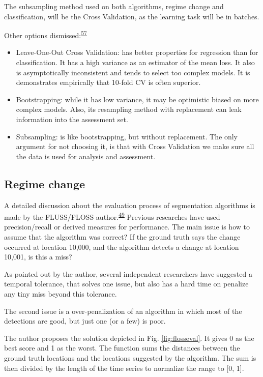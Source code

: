 \documentclass[12pt,twoside]{fmupthesis}
\begin{document}
The subsampling method used on both algorithms, regime change and classification, will be
the Cross Validation, as the learning task will be in batches.

Other options dismissed:\textsuperscript{\protect\hyperlink{ref-Bischl2012}{57}}
\begin{itemize}
\item
  Leave-One-Out Cross Validation: has better properties for regression than for classification. It
  has a high variance as an estimator of the mean loss. It also is asymptotically inconsistent and
  tends to select too complex models. It is demonstrates empirically that 10-fold CV is often
  superior.
\item
  Bootstrapping: while it has low variance, it may be optimistic biased on more complex models.
  Also, its resampling method with replacement can leak information into the assessment set.
\item
  Subsampling: is like bootstrapping, but without replacement. The only argument for not choosing
  it, is that with Cross Validation we make sure all the data is used for analysis and assessment.
\end{itemize}
\hypertarget{regime-change}{%
\subsection{Regime change}\label{regime-change}}

A detailed discussion about the evaluation process of segmentation algorithms is made by the
FLUSS/FLOSS author.\textsuperscript{\protect\hyperlink{ref-gharghabi2018}{49}} Previous researches have used precision/recall or derived
measures for performance. The main issue is how to assume that the algorithm was correct? If the
ground truth says the change occurred at location 10,000, and the algorithm detects a change at
location 10,001, is this a miss?

As pointed out by the author, several independent researchers have suggested a temporal tolerance,
that solves one issue, but also has a hard time on penalize any tiny miss beyond this tolerance.

The second issue is a over-penalization of an algorithm in which most of the detections are
good, but just one (or a few) is poor.

The author proposes the solution depicted in Fig. \ref{fig:flosseval}. It gives 0 as the best score
and 1 as the worst. The function sums the distances between the ground truth locations and the
locations suggested by the algorithm. The sum is then divided by
the length of the time series to normalize the range to {[}0, 1{]}.
\end{document}
